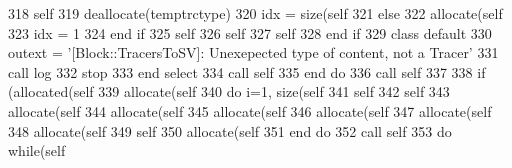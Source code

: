 \begin{DoxyCode}
318                         self%
319                         \textcolor{keyword}{deallocate}(temptrctype)
320                         idx = \textcolor{keyword}{size}(self%
321                     \textcolor{keywordflow}{else}
322                         \textcolor{keyword}{allocate}(self%
323                         idx = 1
324 \textcolor{keywordflow}{                    end if}
325                     self%
326                     self%
327                     self%
328 \textcolor{keywordflow}{                end if}
329 \textcolor{keywordflow}{            class default}
330             outext = \textcolor{stringliteral}{'[Block::TracersToSV]: Unexepected type of content, not a Tracer'}
331             \textcolor{keyword}{call }log%
332             stop
333 \textcolor{keywordflow}{        end select}
334         \textcolor{keyword}{call }self%
335 \textcolor{keywordflow}{    end do}
336     \textcolor{keyword}{call }self%
337     
338     \textcolor{keywordflow}{if} (\textcolor{keyword}{allocated}(self%
339         \textcolor{keyword}{allocate}(self%
340         \textcolor{keywordflow}{do} i=1, \textcolor{keyword}{size}(self%
341             self%
342             self%
343             \textcolor{keyword}{allocate}(self%
344             \textcolor{keyword}{allocate}(self%
345             \textcolor{keyword}{allocate}(self%
346             \textcolor{keyword}{allocate}(self%
347             \textcolor{keyword}{allocate}(self%
348             \textcolor{keyword}{allocate}(self%
349             self%
350             \textcolor{keyword}{allocate}(self%
351 \textcolor{keywordflow}{        end do}
352         \textcolor{keyword}{call }self%
353         \textcolor{keywordflow}{do} \textcolor{keywordflow}{while}(self%

\end{DoxyCode}
